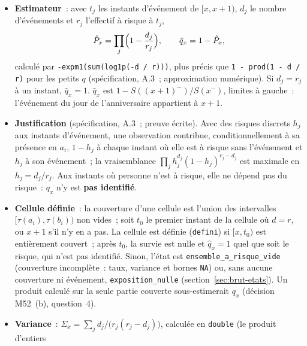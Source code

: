 \documentclass[a4paper,11pt]{article}
\newcommand{\code}[1]{\texttt{\small #1}}
\begin{document}
\begin{itemize}[leftmargin=*, itemsep=2pt]
    appartient donc à l'ensemble à risque de cet instant. Conséquences
    (identités exactes, vérifiées)~: $d_j \le r_j$~; la somme des $d_j$ d'une
    cellule égale le nombre d'événements de la table d'exposition~; un
    événement à l'instant d'entrée est compté. La convention «~prévisible~»
    $\{a < t \le b\}$, écartée, exclurait ces derniers événements~; aucune
    source ne tranche entre les deux (\emph{choix de conception}, mesuré sur
    un cas construit qui les départage, ci-dessous).
  \item \textbf{Estimateur}~: avec $t_j$ les instants d'événement de
    $[x, x+1)$, $d_j$ le nombre d'événements et $r_j$ l'effectif à risque à
    $t_j$,
    \[
      \hat P_x = \prod_j \Bigl(1 - \frac{d_j}{r_j}\Bigr), \qquad
      \hat q_x = 1 - \hat P_x ,
    \]
    calculé par \code{-expm1(sum(log1p(-d / r)))}, plus précis que
    \code{1 - prod(1 - d / r)} pour les petits $q$ (spécification, A.3~;
    approximation numérique). Si $d_j = r_j$ à un instant, $\hat q_x = 1$.
    $\hat q_x$ est $1 - S((x+1)^-)/S(x^-)$, limites à gauche~: l'événement
    du jour de l'anniversaire appartient à $x + 1$.
  \item \textbf{Justification} (spécification, A.3~; preuve écrite). Avec des
    risques discrets $h_j$ aux instants d'événement, une observation
    contribue, conditionnellement à sa présence en $a_i$, $1 - h_j$ à chaque
    instant où elle est à risque sans l'événement et $h_j$ à son événement~;
    la vraisemblance $\prod_j h_j^{d_j}(1 - h_j)^{r_j - d_j}$ est maximale en
    $h_j = d_j/r_j$. Aux instants où personne n'est à risque, elle ne dépend
    pas du risque~: $q_x$ n'y est \textbf{pas identifié}.
  \item \textbf{Cellule définie}~: la couverture d'une cellule est l'union des
    intervalles $[\tau(a_i), \tau(b_i))$ non vides~; soit $t_0$ le premier
    instant de la cellule où $d = r$, ou $x + 1$ s'il n'y en a pas. La
    cellule est définie (\code{defini}) si $[x, t_0)$ est entièrement
    couvert~; après
    $t_0$, la survie est nulle et $\hat q_x = 1$ quel que soit le risque, qui
    n'est pas identifié. Sinon, l'état est \code{ensemble\_a\_risque\_vide}
    (couverture incomplète~: taux, variance et bornes \code{NA}) ou, sans
    aucune couverture ni événement, \code{exposition\_nulle}
    (section~\ref{sec:brut-etats}). Un produit calculé sur la seule partie
    couverte sous-estimerait $q_x$ (décision M52~(b), question~4).
  \item \textbf{Variance}~: $\Sigma_x = \sum_j d_j / \bigl(r_j(r_j -
    d_j)\bigr)$, calculée en \code{double} (le produit d'entiers

\end{itemize}
\end{document}
